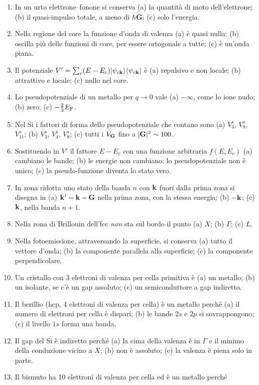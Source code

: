 \documentclass[11pt,a4paper]{article}
\begin{document}
\begin{enumerate}[label=\textbf{R\arabic*.}, leftmargin=2.3em, itemsep=2pt]
\item In un urto elettrone--fonone si conserva
(a) la quantità di moto dell'elettrone; (b) il quasi-impulso totale, a meno di $\hbar\mathbf G$; (c) solo l'energia.
\item Nella regione del core la funzione d'onda di valenza
(a) è quasi nulla; (b) oscilla più delle funzioni di core, per essere ortogonale a tutte; (c) è un'onda piana.
\item Il potenziale $V'=\sum_c(E-E_c)|\psi_{c\mathbf k}\rangle\langle\psi_{c\mathbf k}|$ è
(a) repulsivo e non locale; (b) attrattivo e locale; (c) nullo nel core.
\item Lo pseudopotenziale di un metallo per $q\to0$ vale
(a) $-\infty$, come lo ione nudo; (b) zero; (c) $-\frac23E_{\mathrm F}$.
\item Nel Si i fattori di forma dello pseudopotenziale che contano sono
(a) $V^s_3$, $V^s_8$, $V^s_{11}$; (b) $V^s_3$, $V^s_4$, $V^s_8$; (c) tutti i $V_{\mathbf G}$ fino a $|\mathbf G|^2\sim100$.
\item Sostituendo in $V'$ il fattore $E-E_c$ con una funzione arbitraria $f(E,E_c)$
(a) cambiano le bande; (b) le energie non cambiano: lo pseudopotenziale non è unico; (c) la pseudo-funzione diventa lo stato vero.
\item In zona ridotta uno stato della banda $n$ con $\mathbf k$ fuori dalla prima zona si disegna in
(a) $\mathbf k'=\mathbf k-\mathbf G$ nella prima zona, con la stessa energia; (b) $-\mathbf k$; (c) $\mathbf k$, nella banda $n+1$.
\item Nella zona di Brillouin dell'fcc \emph{non} sta sul bordo il punto
(a) $X$; (b) $\Gamma$; (c) $L$.
\item Nella fotoemissione, attraversando la superficie, si conserva
(a) tutto il vettore d'onda; (b) la componente parallela alla superficie; (c) la componente perpendicolare.
\item Un cristallo con 3 elettroni di valenza per cella primitiva è
(a) un metallo; (b) un isolante, se c'è un gap assoluto; (c) un semiconduttore a gap indiretto.
\item Il berillio (hcp, 4 elettroni di valenza per cella) è un metallo perché
(a) il numero di elettroni per cella è dispari; (b) le bande $2s$ e $2p$ si sovrappongono; (c) il livello $1s$ forma una banda.
\item Il gap del Si è indiretto perché
(a) la cima della valenza è in $\Gamma$ e il minimo della conduzione vicino a $X$; (b) non è assoluto; (c) la valenza è piena solo in parte.
\item Il bismuto ha 10 elettroni di valenza per cella ed è un metallo perché

\end{enumerate}
\end{document}
